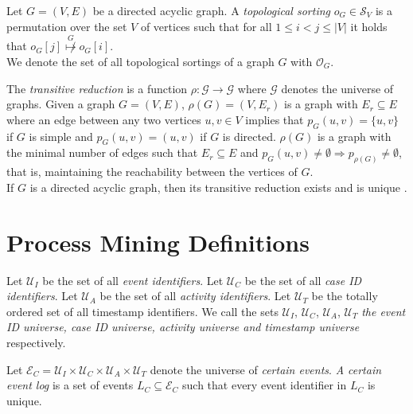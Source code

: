 \begin{definition}\label{def: topological sorting}
Let $G=(V,E)$ be a directed acyclic graph.
A \emph{topological sorting} $o_G \in \mathcal{S}_V$ is a permutation over the set $V$ of vertices such that for all $1 \leq i < j \leq |V|$ it holds that $o_G[j] \overset{G}{\not \mapsto} o_G[i]$.\\
We denote the set of all topological sortings of a graph $G$ with $\mathcal{O}_G$.
\end{definition}

\begin{definition}
The \emph{transitive reduction} is a function $\rho: \mathcal{G} \to \mathcal{G} $ where $\mathcal{G}$ denotes the universe of graphs.
Given a graph $G=(V,E)$, $\rho(G)=(V,E_r)$ is a graph with $E_r \subseteq E$ where an edge between any two vertices $u,v \in V$ implies that $p_G(u,v)=\{u,v\}$ if $G$ is simple and $p_G(u,v)=(u,v)$ if $G$ is directed. 
$\rho(G)$ is a graph with the minimal number of edges such that $E_r \subseteq E$ and $p_G(u,v) \neq \emptyset \Rightarrow p_{\rho(G)} \neq \emptyset$, that is, maintaining the reachability between the vertices of $G$.\\
If $G$ is a directed acyclic graph, then its transitive reduction exists and is unique \cite{transitive}.
\end{definition}
%
%
%
%
%
%
\section{Process Mining Definitions}

\begin{definition}
Let $\mathcal{U}_I$ be the set of all \emph{event identifiers}.
Let $\mathcal{U}_C$ be the set of all \emph{case ID identifiers}.
Let $\mathcal{U}_A$ be the set of all \emph{activity identifiers}.
Let $\mathcal{U}_T$ be the totally ordered set of all timestamp identifiers.
We call the sets $\mathcal{U}_I$, $\mathcal{U}_C$, $\mathcal{U}_A$, $\mathcal{U}_T$ \emph{the event ID universe, case ID universe, activity universe and timestamp universe} respectively.
\end{definition}

\begin{definition}
Let $\mathcal{E}_C = \mathcal{U}_I \times \mathcal{U}_C \times \mathcal{U}_A \times \mathcal{U}_T$ denote the universe of  \emph{certain events}.
\emph{A certain event log} is a set of events $L_C \subseteq \mathcal{E}_C$ such that every event identifier in $L_C$ is unique.
\end{definition}


